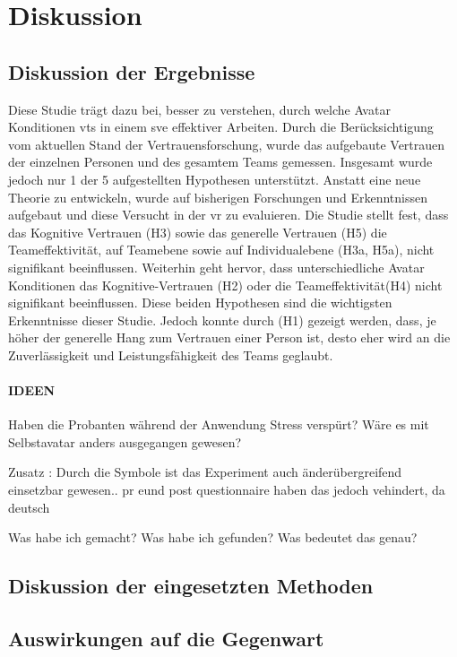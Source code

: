 \documentclass[a4paper,11pt]{article}%
\renewcommand{\\}{\vspace*{0.5\baselineskip} \newline}
\begin{document}
\section{Diskussion}
	\subsection{Diskussion der Ergebnisse}
	Diese Studie trägt dazu bei, besser zu verstehen, durch welche Avatar Konditionen \ac{vts} in einem \ac{sve} effektiver Arbeiten. Durch die Berücksichtigung vom aktuellen Stand der Vertrauensforschung, wurde das aufgebaute Vertrauen der einzelnen Personen und des gesamtem Teams gemessen. Insgesamt wurde jedoch nur 1 der 5 aufgestellten Hypothesen unterstützt. 
Anstatt eine neue Theorie zu entwickeln, wurde auf bisherigen Forschungen und Erkenntnissen aufgebaut und diese Versucht in der \ac{vr} zu evaluieren.
Die Studie stellt fest, dass das Kognitive Vertrauen (H3) sowie das generelle Vertrauen (H5) die Teameffektivität, auf Teamebene sowie auf Individualebene (H3a, H5a), nicht signifikant beeinflussen. 
Weiterhin geht hervor, dass unterschiedliche Avatar Konditionen das Kognitive-Vertrauen (H2) oder die Teameffektivität(H4) nicht signifikant beeinflussen. Diese beiden Hypothesen sind die wichtigsten Erkenntnisse dieser Studie.
Jedoch konnte durch (H1) gezeigt werden, dass, je höher der generelle Hang zum Vertrauen einer Person ist, desto eher wird an die Zuverlässigkeit und Leistungsfähigkeit des Teams geglaubt.


\paragraph{IDEEN}
Haben die Probanten während der Anwendung Stress verspürt?
Wäre es mit Selbstavatar anders ausgegangen gewesen?

Zusatz :
Durch die Symbole ist das Experiment auch änderübergreifend einsetzbar gewesen.. pr eund post questionnaire haben das jedoch vehindert, da deutsch

	Was habe ich gemacht?
	Was habe ich gefunden? 
	Was bedeutet das genau?
	\subsection{Diskussion der eingesetzten Methoden}
	\subsection{Auswirkungen auf die Gegenwart}
\end{document}
